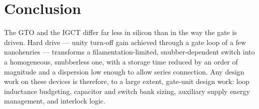 \documentclass[11pt,a4paper]{report}
\begin{document}
\section{Conclusion}

The GTO and the IGCT differ far less in silicon than in the way the gate is
driven. Hard drive --- unity turn-off gain achieved through a gate loop of a few
nanohenries --- transforms a filamentation-limited, snubber-dependent switch into
a homogeneous, snubberless one, with a storage time reduced by an order of
magnitude and a dispersion low enough to allow series connection. Any design work
on these devices is therefore, to a large extent, gate-unit design work: loop
inductance budgeting, capacitor and switch bank sizing, auxiliary supply energy
management, and interlock logic.



\end{document}
